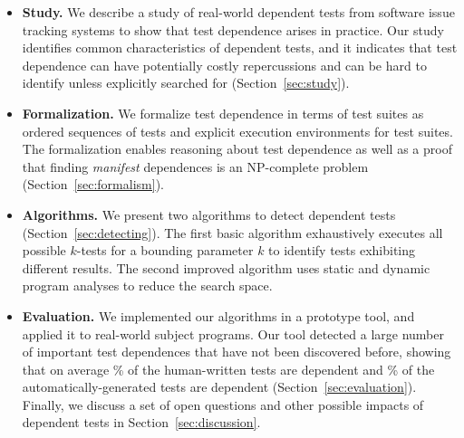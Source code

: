 \begin{itemize}

  \item \textbf{Study.} We describe a study of \dtnum real-world
  dependent tests from \repnum software issue tracking
  systems to show that test dependence
  arises in practice. Our study identifies common
  characteristics of dependent tests, and
  it indicates that test dependence can have
  potentially costly repercussions and can be hard to identify unless
  explicitly searched for (Section~\ref{sec:study}).

\item \textbf{Formalization.} We formalize test dependence
  in terms of test suites as ordered sequences of tests and explicit execution
  environments for test suites.  The formalization enables reasoning about test dependence
  as well as a proof that finding \emph{manifest} dependences is an NP-complete
  problem (Section~\ref{sec:formalism}).

  \item \textbf{Algorithms.} We present two algorithms
  to detect dependent tests (Section~\ref{sec:detecting}). The first
  basic algorithm exhaustively executes all possible $k$-tests for
  a bounding parameter $k$ to identify tests exhibiting different results.
  The second improved algorithm uses static and dynamic program analyses
  to reduce the search space. 

  \item \textbf{Evaluation.} We implemented our algorithms in a prototype
  tool, and applied it to  real-world subject programs. Our
  tool detected a large number of important test dependences that have not
  been discovered before, showing that on average \% of the human-written
  tests are dependent and \% of the automatically-generated tests are dependent
   (Section~\ref{sec:evaluation}).
  Finally, we discuss a set of open questions and other possible impacts of dependent
  tests in Section~\ref{sec:discussion}.
\end{itemize}


